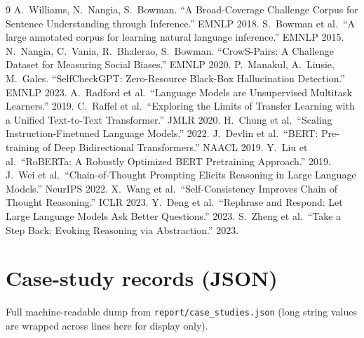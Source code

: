 \documentclass[11pt]{article}
\begin{document}
\begin{thebibliography}{9}
\small
{} A.~Williams, N.~Nangia, S.~Bowman. ``A Broad-Coverage Challenge Corpus for Sentence Understanding through Inference.'' EMNLP 2018.
 S.~Bowman et al.\ ``A large annotated corpus for learning natural language inference.'' EMNLP 2015.
 N.~Nangia, C.~Vania, R.~Bhalerao, S.~Bowman. ``CrowS-Pairs: A Challenge Dataset for Measuring Social Biases.'' EMNLP 2020.
 P.~Manakul, A.~Liusie, M.~Gales. ``SelfCheckGPT: Zero-Resource Black-Box Hallucination Detection.'' EMNLP 2023.
 A.~Radford et al.\ ``Language Models are Unsupervised Multitask Learners.'' 2019.
 C.~Raffel et al.\ ``Exploring the Limits of Transfer Learning with a Unified Text-to-Text Transformer.'' JMLR 2020.
 H.~Chung et al.\ ``Scaling Instruction-Finetuned Language Models.'' 2022.
 J.~Devlin et al.\ ``BERT: Pre-training of Deep Bidirectional Transformers.'' NAACL 2019.
 Y.~Liu et al.\ ``RoBERTa: A Robustly Optimized BERT Pretraining Approach.'' 2019.
 J.~Wei et al.\ ``Chain-of-Thought Prompting Elicits Reasoning in Large Language Models.'' NeurIPS 2022.
 X.~Wang et al.\ ``Self-Consistency Improves Chain of Thought Reasoning.'' ICLR 2023.
 Y.~Deng et al.\ ``Rephrase and Respond: Let Large Language Models Ask Better Questions.'' 2023.
 S.~Zheng et al.\ ``Take a Step Back: Evoking Reasoning via Abstraction.'' 2023.
\end{thebibliography}

\appendix
\section{Case-study records (JSON)}
\label{app:cases}
Full machine-readable dump from \texttt{report/case\_studies.json} (long string values are
wrapped across lines here for display only).
\end{document}
